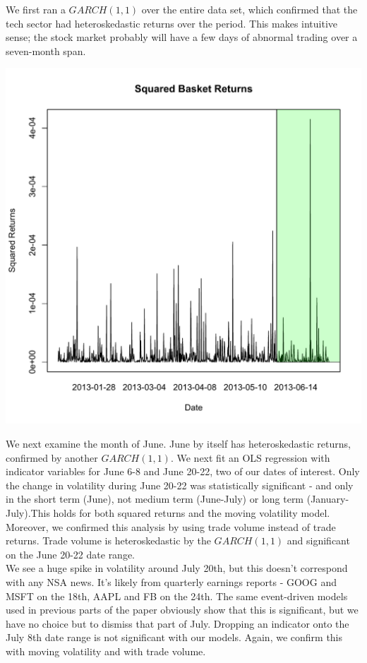 \documentclass[11pt]{amsart}
\begin{document}
We first ran a $GARCH(1,1)$ over the entire data set, which confirmed that the tech sector had heteroskedastic returns over the period. This makes intuitive sense; the stock market probably will have a few days of abnormal trading over a seven-month span. \\

\newpage

\centerline{\includegraphics[scale=0.5]{basket_sq_returns_12_08.pdf}}

We next examine the month of June. June by itself has heteroskedastic returns, confirmed by another $GARCH(1,1)$. We next fit an OLS regression with indicator variables for June 6-8 and June 20-22, two of our dates of interest. Only the change in volatility during June 20-22 was statistically significant - and only in the short term (June), not medium term (June-July) or long term (January-July).This holds for both squared returns and the moving volatility model. \\

Moreover, we confirmed this analysis by using trade volume instead of trade returns. Trade volume is heteroskedastic by the $GARCH(1,1)$ and significant on the June 20-22 date range. \\

We see a huge spike in volatility around July 20th, but this doesn't correspond with any NSA news. It's likely from quarterly earnings reports - GOOG and MSFT on the 18th, AAPL and FB on the 24th. The same event-driven models used in previous parts of the paper obviously show that this is significant, but we have no choice but to dismiss that part of July. Dropping an indicator onto the July 8th date range is not significant with our models. Again, we confirm this with moving volatility and with trade volume. \\
\end{document}
